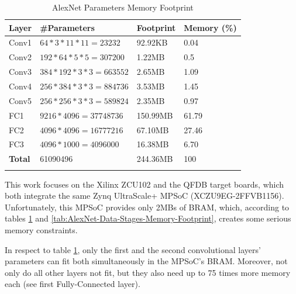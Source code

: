 \begin{table}[H]
	\caption{AlexNet Parameters Memory Footprint}
	\label{tab:AlexNet-Parameters-Memory-Footprint}
	\centering
	\begin{tabular}{llll}
		\toprule
		\textbf{Layer} & \textbf{\#Parameters} & \textbf{Footprint} & \textbf{Memory (\%)}  \\
		\midrule
			Conv1 & $64 * 3 * 11 * 11 = 23232$ & 92.92KB & 0.04 \\
			Conv2 & $192 * 64 * 5 * 5 = 307200$ & 1.22MB & 0.5 \\
			Conv3 & $384 * 192 * 3 * 3 = 663552$ & 2.65MB & 1.09 \\
			Conv4 & $256 * 384 * 3 * 3 = 884736$ & 3.53MB & 1.45 \\
			Conv5 & $256 * 256 * 3 * 3 = 589824$ & 2.35MB & 0.97 \\
			FC1 & $9216 * 4096 = 37748736$ & 150.99MB & 61.79 \\
			FC2 & $4096 * 4096 = 16777216$ & 67.10MB & 27.46 \\
			FC3 & $4096 * 1000 = 4096000$ & 16.38MB & 6.70 \\
		\midrule
			\textbf{Total} & 61090496 & 244.36MB & 100 \\
		\bottomrule\\
	\end{tabular}
\end{table}

This work focuses on the Xilinx ZCU102 \cite{ZCU102-User-Guide} and the QFDB \cite{Implementation-and-Impact-of-an-Ultra-Compact-Multi-FPGA-Board-for-Large-System-Prototyping} target boards, which both integrate the same Zynq UltraScale+ MPSoC (XCZU9EG-2FFVB1156). Unfortunately, this MPSoC provides only 2MBs of BRAM, which, according to tables \ref{tab:AlexNet-Parameters-Memory-Footprint} and \ref{tab:AlexNet-Data-Stages-Memory-Footprint}, creates some serious memory constraints.

In respect to table \ref{tab:AlexNet-Parameters-Memory-Footprint}, only the first and the second convolutional layers' parameters can fit both simultaneously in the MPSoC's BRAM. Moreover, not only do all other layers not fit, but they also need up to 75 times more memory each (see first Fully-Connected layer).

